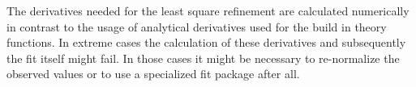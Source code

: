 The derivatives needed for the least square refinement are
calculated numerically in contrast to the usage of analytical
derivatives used for the build in theory functions. In extreme cases
the calculation of these derivatives and subsequently the fit itself
might fail. In those cases it might be necessary to re-normalize the
observed values or to use a specialized fit package after all.

